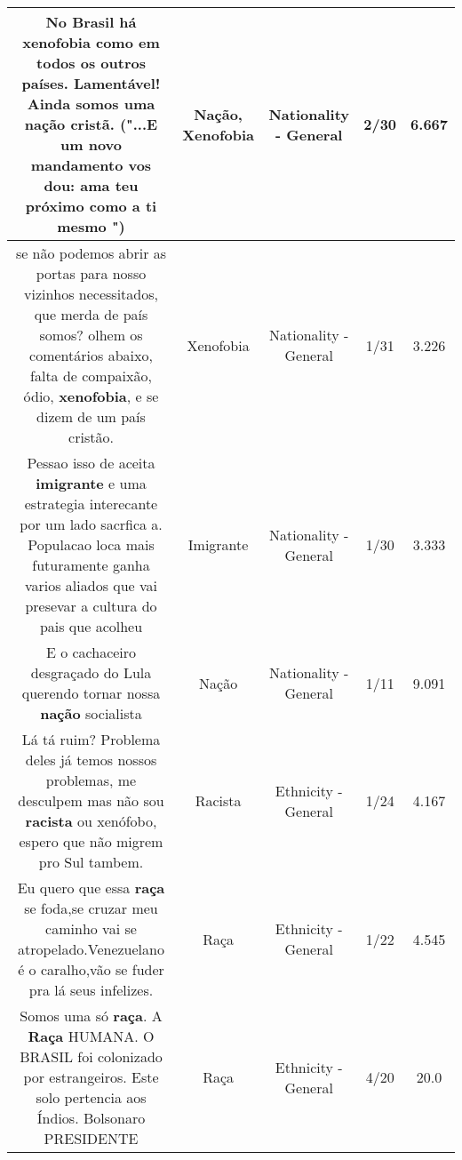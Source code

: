 \documentclass[11pt]{article}
\newlength\mylength
\begin{document}
\begin{center}
\begin{longtable}{|C{.65\mylength}|C{.30\mylength}|C{.12\mylength}|C{.12\mylength}|C{.12\mylength}|}
  \small No Brasil há \textbf{xenofobia} como em todos os outros países. Lamentável! Ainda somos uma \textbf{nação} cristã. ("...E um novo mandamento vos dou: ama teu próximo como a ti mesmo ")\normalsize   & Nação, Xenofobia & Nationality - General & 2/30 & 6.667 \\  \hline
  \small se não podemos abrir as portas para nosso vizinhos necessitados, que merda de país somos? olhem os comentários abaixo, falta de compaixão, ódio, \textbf{xenofobia},  e se dizem de um país cristão.\normalsize   & Xenofobia & Nationality - General & 1/31 & 3.226 \\  \hline
  \small Pessao isso de aceita \textbf{imigrante} e uma estrategia interecante por um lado sacrfica a. Populacao loca mais futuramente ganha varios aliados que vai presevar a cultura do pais que acolheu\normalsize   & Imigrante & Nationality - General & 1/30 & 3.333 \\  \hline
  \small E o cachaceiro desgraçado do Lula querendo tornar nossa \textbf{nação} socialista\normalsize   & Nação & Nationality - General & 1/11 & 9.091 \\  \hline
  \small Lá tá ruim? Problema deles já temos nossos problemas, me desculpem mas não sou \textbf{racista} ou xenófobo, espero que não migrem pro Sul tambem.\normalsize   & Racista & Ethnicity - General & 1/24 & 4.167 \\  \hline
  \small Eu quero que essa \textbf{raça} se foda,se cruzar meu caminho vai se atropelado.Venezuelano é o caralho,vão se fuder pra lá seus infelizes.\normalsize   & Raça & Ethnicity - General & 1/22 & 4.545 \\  \hline
  \small Somos uma só \textbf{raça}. A \textbf{Raça} HUMANA. O BRASIL foi colonizado por estrangeiros. Este solo pertencia aos Índios. Bolsonaro PRESIDENTE\normalsize   & Raça & Ethnicity - General & 4/20 & 20.0 \\  \hline

\end{longtable}
\end{center}
\end{document}
